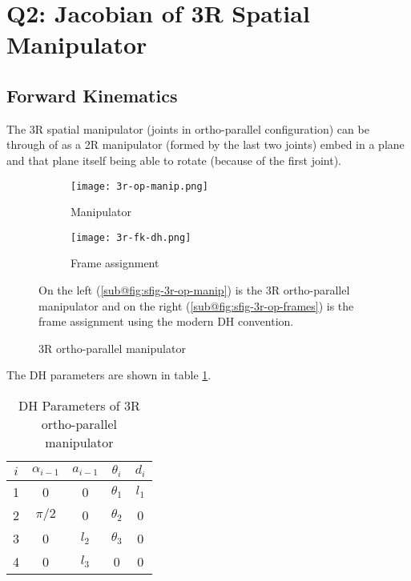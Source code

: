
\section{Q2: Jacobian of 3R Spatial Manipulator}

\subsection*{Forward Kinematics}

The 3R spatial manipulator (joints in ortho-parallel configuration) can be through of as a 2R manipulator (formed by the last two joints) embed in a plane and that plane itself being able to rotate (because of the first joint).

\begin{figure}[ht]
    \centering
    \begin{subfigure}[b]{0.4 \textwidth}
        \centering
        \texttt{[image: 3r-op-manip.png]}
        \caption{Manipulator}
        \label{fig:sfig-3r-op-manip}
    \end{subfigure}
    \begin{subfigure}[b]{0.4 \textwidth}
        \centering
        \texttt{[image: 3r-fk-dh.png]}
        \caption{Frame assignment}
        \label{fig:sfig-3r-op-frames}
    \end{subfigure}
    \caption{3R ortho-parallel manipulator}
    \label{fig:3r-op-manip-frames}
    \small
        On the left (\ref{sub@fig:sfig-3r-op-manip}) is the 3R ortho-parallel manipulator and on the right (\ref{sub@fig:sfig-3r-op-frames}) is the frame assignment using the modern DH convention.
\end{figure}

The DH parameters are shown in table \ref{tab:3r-op-dh-params}.

\begin{table}[h]
    \centering
    \begin{tabular}{ || c || c | c | c | c || }
        \hline
        $i$ & $\alpha_{i-1}$ & $a_{i-1}$ & $\theta_{i}$ & $d_{i}$ \\
        \hline \hline
        1 & 0 & 0 & $\theta_1$ & $l_1$ \\
        \hline
        2 & $\pi / 2$ & 0 & $\theta_2$ & 0 \\
        \hline
        3 & 0 & $l_2$ & $\theta_3$ & 0 \\
        \hline
        4 & 0 & $l_3$ & 0 & 0 \\
        \hline
    \end{tabular}
    \caption{DH Parameters of 3R ortho-parallel manipulator}
    \label{tab:3r-op-dh-params}
\end{table}

